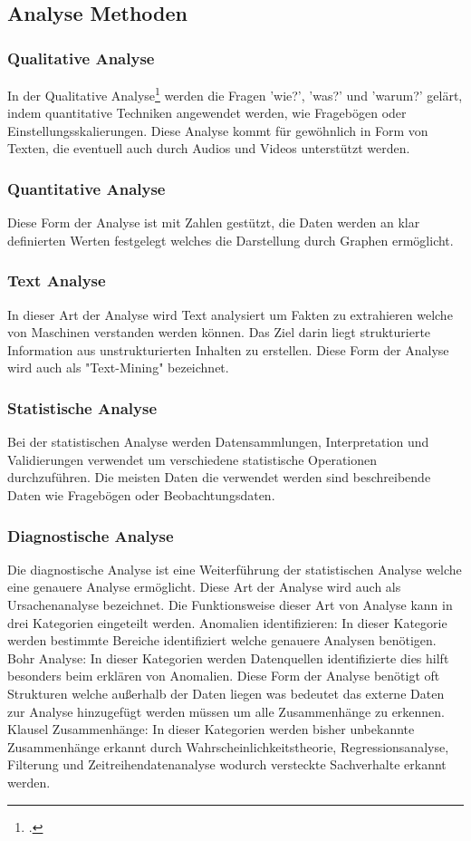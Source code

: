 		\subsection{Analyse Methoden} 
			\subsubsection{Qualitative Analyse}
				In der Qualitative Analyse\footcite{analyse-methode} werden die Fragen 'wie?', 'was?' und 'warum?' gelärt, indem quantitative Techniken angewendet werden, wie Fragebögen oder Einstellungsskalierungen. 
				Diese Analyse kommt für gewöhnlich in Form von Texten, die eventuell auch durch Audios und Videos unterstützt werden. 				
			\subsubsection{Quantitative Analyse}
				Diese Form der Analyse ist mit Zahlen gestützt, die Daten werden an klar definierten Werten festgelegt welches die Darstellung durch Graphen ermöglicht.		
			\subsubsection{Text Analyse}
				In dieser Art der Analyse wird Text analysiert um Fakten zu extrahieren welche von Maschinen verstanden werden können. 
				Das Ziel darin liegt strukturierte Information aus unstrukturierten Inhalten zu erstellen. Diese Form der Analyse wird auch als "Text-Mining" bezeichnet.		
			\subsubsection{Statistische Analyse}
				Bei der statistischen Analyse werden Datensammlungen, Interpretation und Validierungen verwendet um verschiedene statistische Operationen durchzuführen. 
				Die meisten Daten die verwendet werden sind beschreibende Daten wie Fragebögen oder Beobachtungsdaten. 			
			\subsubsection{Diagnostische Analyse}
				Die diagnostische Analyse ist eine Weiterführung der statistischen Analyse welche eine genauere Analyse ermöglicht. Diese Art der Analyse wird auch als Ursachenanalyse bezeichnet. Die Funktionsweise dieser Art von Analyse kann in drei Kategorien eingeteilt werden. \newline
				Anomalien identifizieren: In dieser Kategorie werden bestimmte Bereiche identifiziert welche genauere Analysen benötigen. \newline
				Bohr Analyse: In dieser Kategorien werden Datenquellen identifizierte dies hilft besonders beim erklären von Anomalien. Diese Form der Analyse benötigt oft Strukturen welche außerhalb der Daten liegen was bedeutet das externe Daten zur Analyse hinzugefügt werden müssen um alle Zusammenhänge zu erkennen.  \newline
				Klausel Zusammenhänge: In dieser Kategorien werden bisher unbekannte Zusammenhänge erkannt durch Wahrscheinlichkeitstheorie, Regressionsanalyse, Filterung und Zeitreihendatenanalyse wodurch versteckte Sachverhalte erkannt werden.  				
